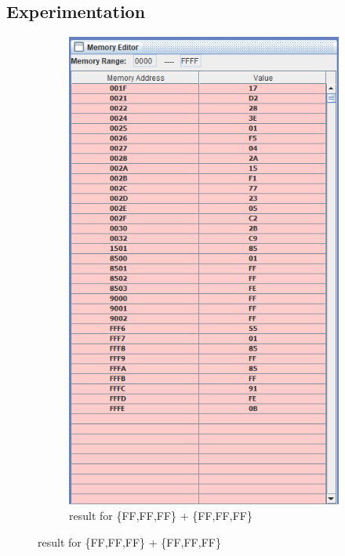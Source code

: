 \documentclass[a4paper]{article} %
\begin{document}
    \subsection{Experimentation}
        \begin{figure}[h!]
            \centering
            \begin{subfigure}[b]{0.49\linewidth}
                \centering
                \includegraphics[width=\linewidth]{Assignment 2/3_multibyte_add/FFFFFF_FFFFFF.png}
                \caption{result for \{FF,FF,FF\} + \{FF,FF,FF\}}

\end{subfigure}
\end{figure}
\end{document}
